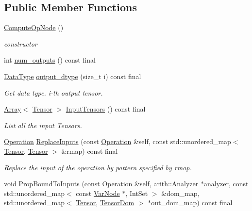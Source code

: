 \subsection*{Public Member Functions}
\begin{DoxyCompactItemize}
\item 
\hyperlink{classtvm_1_1te_1_1ComputeOpNode_a45e42c63bd2ba62b6f85b9b79e0b9361}{Compute\+Op\+Node} ()
\begin{DoxyCompactList}\small\item\em constructor \end{DoxyCompactList}\item 
int \hyperlink{classtvm_1_1te_1_1ComputeOpNode_ac4b034b11601367864722954c1b7c7fe}{num\+\_\+outputs} () const final
\item 
\hyperlink{namespacetvm_a41918af1a1dc386388639a9d3ad06c5d}{Data\+Type} \hyperlink{classtvm_1_1te_1_1ComputeOpNode_a308edf04ade47c1365c9f8460858fdd6}{output\+\_\+dtype} (size\+\_\+t i) const final
\begin{DoxyCompactList}\small\item\em Get data type. i-\/th output tensor. \end{DoxyCompactList}\item 
\hyperlink{classtvm_1_1Array}{Array}$<$ \hyperlink{classtvm_1_1te_1_1Tensor}{Tensor} $>$ \hyperlink{classtvm_1_1te_1_1ComputeOpNode_a9a2ce85d831b05fd11a525647132b81f}{Input\+Tensors} () const final
\begin{DoxyCompactList}\small\item\em List all the input Tensors. \end{DoxyCompactList}\item 
\hyperlink{classtvm_1_1te_1_1Operation}{Operation} \hyperlink{classtvm_1_1te_1_1ComputeOpNode_abd13cd58b1d9754ad708fe47e9379b33}{Replace\+Inputs} (const \hyperlink{classtvm_1_1te_1_1Operation}{Operation} \&self, const std\+::unordered\+\_\+map$<$ \hyperlink{classtvm_1_1te_1_1Tensor}{Tensor}, \hyperlink{classtvm_1_1te_1_1Tensor}{Tensor} $>$ \&rmap) const final
\begin{DoxyCompactList}\small\item\em Replace the input of the operation by pattern specified by rmap. \end{DoxyCompactList}\item 
void \hyperlink{classtvm_1_1te_1_1ComputeOpNode_a316aeec37888f4f4e0906743b1a7f0b5}{Prop\+Bound\+To\+Inputs} (const \hyperlink{classtvm_1_1te_1_1Operation}{Operation} \&self, \hyperlink{classtvm_1_1arith_1_1Analyzer}{arith\+::\+Analyzer} $\ast$analyzer, const std\+::unordered\+\_\+map$<$ const \hyperlink{classtvm_1_1tir_1_1VarNode}{Var\+Node} $\ast$, Int\+Set $>$ \&dom\+\_\+map, std\+::unordered\+\_\+map$<$ \hyperlink{classtvm_1_1te_1_1Tensor}{Tensor}, \hyperlink{structtvm_1_1te_1_1TensorDom}{Tensor\+Dom} $>$ $\ast$out\+\_\+dom\+\_\+map) const final

\end{DoxyCompactItemize}
